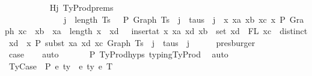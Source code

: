 \begin{isabellebody}
\ \ \ \ \ \ \ \ \ \isamarkupfalse%
\ Hj\ TyProd{\isachardot}{\kern0pt}prems{\isacharparenleft}{\kern0pt}{}{\isacharcomma}{\kern0pt}{}{\isacharcomma}{\kern0pt}{}{\isacharcomma}{\kern0pt}{}{\isacharcomma}{\kern0pt}{}{\isacharparenright}{\kern0pt}\isanewline
\ \ \ \ \ \ \ \ \ \ \ \ \ \ {\isacartoucheopen}j\ {\isacharless}{\kern0pt}\ length\ Ts\ {\isasymLongrightarrow}\ {\isasymGamma}\ {\isasymturnstile}{\isacharbraceleft}{\kern0pt}P{\isacharbraceright}{\kern0pt}\ Graph\ {\isacharparenleft}{\kern0pt}Ts\ {\isacharbang}{\kern0pt}\ j{\isacharparenright}{\kern0pt}\ {\isacharcolon}{\kern0pt}\ taus\ {\isacharbang}{\kern0pt}\ j\ {\isasymand}\ {\isacharparenleft}{\kern0pt}{\isasymforall}x\ xa\ xb\ xc{\isachardot}{\kern0pt}\ x\ {\isasymturnstile}{\isacharbraceleft}{\kern0pt}P{\isacharbraceright}{\kern0pt}\ Graph\ xc\ {\isacharcolon}{\kern0pt}\ xb\ {\isasymlongrightarrow}\ xa\ {\isasymle}\ length\ x\ {\isasymlongrightarrow}\ {\isacharparenleft}{\kern0pt}{\isasymforall}xd{\isachardot}{\kern0pt}\ {\isasymGamma}\ {\isacharequal}{\kern0pt}\ insert{\isacharunderscore}{\kern0pt}at\ x\ xa\ {\isacharparenleft}{\kern0pt}xd{\isacharcomma}{\kern0pt}\ xb{\isacharparenright}{\kern0pt}\ {\isasymlongrightarrow}\ set\ xd\ {\isacharequal}{\kern0pt}\ FL\ xc\ {\isasymlongrightarrow}\ distinct\ xd\ {\isasymlongrightarrow}\ x\ {\isasymturnstile}{\isacharbraceleft}{\kern0pt}P{\isacharbraceright}{\kern0pt}\ subst\ xa\ xd\ xc\ {\isacharparenleft}{\kern0pt}Graph\ {\isacharparenleft}{\kern0pt}Ts\ {\isacharbang}{\kern0pt}\ j{\isacharparenright}{\kern0pt}{\isacharparenright}{\kern0pt}\ {\isacharcolon}{\kern0pt}\ taus\ {\isacharbang}{\kern0pt}\ j{\isacharparenright}{\kern0pt}{\isacharparenright}{\kern0pt}{\isacartoucheclose}\isanewline
\ \ \ \ \isamarkupfalse%
\ presburger\isanewline
\ \ \ \ \isamarkupfalse%
\isanewline
\isanewline
\ \ \isamarkupfalse%
\ \isamarkupfalse%
\ {\isacharquery}{\kern0pt}case\isanewline
\ \ \isamarkupfalse%
\ auto\isanewline
\ \ \ \ \ \isamarkupfalse%
\ P{}\ TyProd{\isachardot}{\kern0pt}hyps{\isacharparenleft}{\kern0pt}{}{\isacharcomma}{\kern0pt}{}{\isacharcomma}{\kern0pt}{}{\isacharcomma}{\kern0pt}{}{\isacharparenright}{\kern0pt}\ typing{\isachardot}{\kern0pt}TyProd\ \isamarkupfalse%
\ auto\isanewline
{}\isamarkupfalse%
\isanewline
\ \ \isamarkupfalse%
\ {\isacharparenleft}{\kern0pt}TyCase\ {\isasymGamma}\ P\ e{}\ ty{}{\isacharprime}{\kern0pt}\ {\isasymGamma}{}{\isacharprime}{\kern0pt}\ e{}\ ty{}{\isacharprime}{\kern0pt}\ e{}\ T{\isacharparenright}{\kern0pt}\isanewline

\end{isabellebody}
